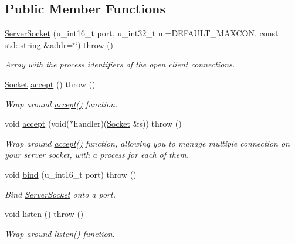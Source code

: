 \subsection*{Public Member Functions}
\begin{CompactItemize}
\item 
\hyperlink{classusock_1_1ServerSocket_0ac1908d4a4afb675715ae0ad994e870}{ServerSocket} (u\_\-int16\_\-t port, u\_\-int32\_\-t m=DEFAULT\_\-MAXCON, const std::string \&addr=\char`\"{}\char`\"{})  throw ()
\begin{CompactList}\small\item\em Array with the process identifiers of the open client connections. \item\end{CompactList}\item 
\hyperlink{classusock_1_1Socket}{Socket} \hyperlink{classusock_1_1ServerSocket_bf0477af52a725ced6afad86d7b3e794}{accept} ()  throw ()
\begin{CompactList}\small\item\em Wrap around \hyperlink{classusock_1_1ServerSocket_bf0477af52a725ced6afad86d7b3e794}{accept()} function. \item\end{CompactList}\item 
void \hyperlink{classusock_1_1ServerSocket_0ef5b201140a37c5d7c42aced9a45f2e}{accept} (void($\ast$handler)(\hyperlink{classusock_1_1Socket}{Socket} \&s))  throw ()
\begin{CompactList}\small\item\em Wrap around \hyperlink{classusock_1_1ServerSocket_bf0477af52a725ced6afad86d7b3e794}{accept()} function, allowing you to manage multiple connection on your server socket, with a process for each of them. \item\end{CompactList}\item 
void \hyperlink{classusock_1_1ServerSocket_9ecf37cae8379df6eaf366ab88df244a}{bind} (u\_\-int16\_\-t port)  throw ()
\begin{CompactList}\small\item\em Bind \hyperlink{classusock_1_1ServerSocket}{ServerSocket} onto a port. \item\end{CompactList}\item 
void \hyperlink{classusock_1_1ServerSocket_c6cd2070380b84275c5f69265c57713b}{listen} ()  throw ()
\begin{CompactList}\small\item\em Wrap around \hyperlink{classusock_1_1ServerSocket_c6cd2070380b84275c5f69265c57713b}{listen()} function. \item\end{CompactList}\end{CompactItemize}


